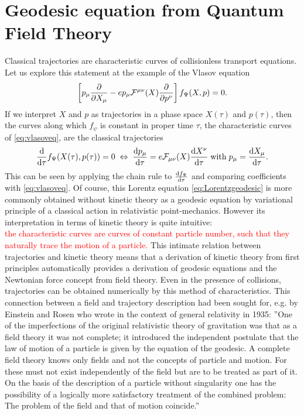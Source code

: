 \section{Geodesic equation from Quantum Field Theory}
Classical trajectories are characteristic curves of
collisionless transport equations. Let us explore this statement at the example of the Vlasov equation
\begin{equation}
\label{eq:vlasoveq}
	\left[p_\mu \frac{\partial}{\partial X_\mu} -e p_\mu \mathcal{F}^{\mu \nu} (X) \frac{\partial}{\partial p^\nu}\right] f_\Psi(X,p)=0.
\end{equation}
If we interpret $X$ and $p$ as trajectories in a phase space $X(\tau)$ and $p(\tau)$, then the curves along which $f_\psi$ is constant in proper time $\tau$, the characteristic curves of \ref{eq:vlasoveq}, are the classical trajectories
\begin{equation}
\label{eq:Lorentzgeodesic}
	\frac{\mathrm{d}}{\mathrm{d} \tau} f_\Psi(X(\tau),p(\tau)) =0\; \Leftrightarrow \; \frac{\mathrm{d} p_\mu}{\mathrm{d} \tau} = e \mathcal{F}_{\mu \nu}(X) \frac{\mathrm{d} X^\nu}{\mathrm{d} \tau} \; \mathrm{with} \;p_\mu=\frac{\mathrm{d} X_\mu}{\mathrm{d} \tau}.
\end{equation}
This can be seen by applying the chain rule to $\frac{\mathrm{d} f_\Psi}{\mathrm{d} \tau}$ and comparing coefficients with \ref{eq:vlasoveq}. Of course, this Lorentz equation \ref{eq:Lorentzgeodesic} is more commonly obtained without kinetic theory as a geodesic equation by variational principle of a classical action in relativistic point-mechanics. However its interpretation in terms of kinetic theory is quite intuitive:\\
\textcolor{red}{the characteristic curves are curves of constant particle number, such that they naturally trace the motion of a particle.} This intimate relation between trajectories and
kinetic theory means that a derivation of kinetic theory from first principles automatically provides a
derivation of geodesic equations and the Newtonian force concept from field theory. Even in the presence
of collisions, trajectories can be obtained numerically by this method of characteristics. This connection between a field and trajectory description had been sought for, e.g. by
Einstein and Rosen who wrote in the context of general relativity in 1935: ”One of the imperfections of
the original relativistic theory of gravitation was that as a field theory it was not complete; it introduced
the independent postulate that the law of motion of a particle is given by the equation of the geodesic.
A complete field theory knows only fields and not the concepts of particle and motion. For these must
not exist independently of the field but are to be treated as part of it. On the basis of the description
of a particle without singularity one has the possibility of a logically more satisfactory treatment of the
combined problem: The problem of the field and that of motion coincide.”













\newpage